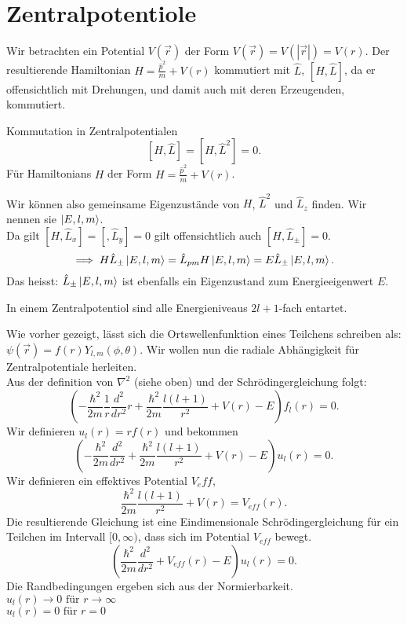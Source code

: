 \documentclass{report}
\begin{document}
\section{Zentralpotentiole}
Wir betrachten ein Potential $V(\vec{r})$ der Form $V(\vec{r}) = V(|\vec{r}|) = V(r) $. Der resultierende Hamiltonian $H = \frac{\hat{p}^2}{m} + V(r)$ kommutiert mit $\hat{L}$, $[H, \hat{L}]$, da er offensichtlich mit Drehungen, und damit auch mit deren Erzeugenden, kommutiert.\\
\begin{redbox}{Kommutation in Zentralpotentialen}
	\[
		[H, \hat{L}] = [H, \hat{L}^2] = 0
	.\] Für Hamiltonians $H$ der Form $H = \frac{\hat{p}^2}{m} + V(r)$.
\end{redbox}
Wir können also gemeinsame Eigenzustände von $H$, $\hat{L}^2$ und $\hat{L}_z$ finden. Wir nennen sie $\ket{E,l,m} $.\\
Da gilt $[H, \hat{L}_x] = [, \hat{L}_y] = 0$ gilt offensichtlich auch $[H,\hat{L}_{\pm}] = 0$. \[
	\implies H\hat{L}_{\pm} \ket{E,l,m} = \hat{L}_{pm}H\ket{E,l,m} = E \hat{L}_{\pm} \ket{E,l,m}  
.\] Das heisst: $\hat{L}_{\pm} \ket{E,l,m} $ ist ebenfalls ein Eigenzustand zum Energieeigenwert $E$. 
\begin{redbox}{}
	In einem Zentralpotentiol sind alle Energieniveaus $2l + 1$-fach entartet. 
\end{redbox}
Wie vorher gezeigt, lässt sich die Ortswellenfunktion eines Teilchens schreiben als: $\psi(\vec{r}) = f(r) Y_{l,m}(\phi, \theta)$. Wir wollen nun die radiale Abhängigkeit für Zentralpotentiale herleiten.\\
Aus der definition von $\nabla ^2$ (siehe oben) und der Schrödingergleichung folgt: \[
	\left( -\frac{\hbar^2}{2m} \frac{1}{r} \frac{d^2}{dr^2}r + \frac{\hbar^2}{2m} \frac{l (l+1)}{r^2} + V(r) - E \right) f_l(r) = 0
.\] Wir definieren $u_l(r) = rf(r)$ und bekommen \[
	\left( -\frac{\hbar^2}{2m} \frac{d^2}{dr^2} + \frac{\hbar^2}{2m} \frac{l (l+1)}{r^2} + V(r) - E \right) u_l(r) = 0
.\]  Wir definieren ein effektives Potential $V_eff$, \[
\frac{\hbar^2}{2m} \frac{l(l+1)}{r^2} + V(r) = V_{eff}(r)
.\] Die resultierende Gleichung ist eine Eindimensionale Schrödingergleichung für ein Teilchen im Intervall $[0, \infty)$, dass sich im Potential $V_{eff}$ bewegt. \[
\left( \frac{\hbar^2}{2m} \frac{d^2}{dr^2} + V_{eff}(r) - E \right) u_l(r) = 0
.\] Die Randbedingungen ergeben sich aus der Normierbarkeit. \\
$u_l(r) \to 0 \text{ für } r \to \infty$ \\
$u_l(r) = 0 \text{ für } r = 0$ \\
\end{document}

